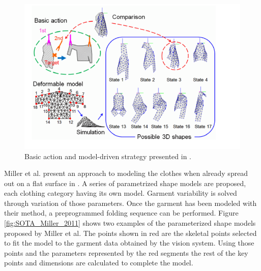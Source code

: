\begin{figure}[thpb]
    \centering
    \includegraphics[width=0.95
    \textwidth]{figures/SOTA_Kita_2009.png}
    \caption[Basic action and model-driven strategy presented by Kita et al.]
    {Basic action and model-driven strategy presented in \cite{Kita2009}.}
    \label{fig:SOTA_Kita_2009}
\end{figure}

Miller et al. present an approach to modeling the clothes when already spread out on a flat surface in \cite{Miller2011}. A series of parametrized shape models are proposed, each clothing category having its own model. Garment variability is solved through variation of those parameters. Once the garment has been modeled with their method, a preprogrammed folding sequence can be performed. Figure \ref{fig:SOTA_Miller_2011} shows two examples of the parameterized shape models proposed by Miller et al. The points shown in red are the skeletal points selected to fit the model to the garment data obtained by the vision system. Using those points and the parameters represented by the red segments the rest of the key points and dimensions are calculated to complete the model.

